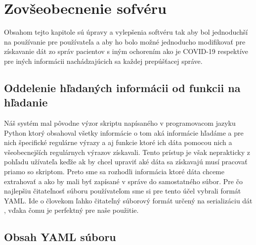 \chapter{Zovšeobecnenie sofvéru}

Obsahom tejto kapitole sú úpravy a vylepšenia softvéru tak aby bol jednoduchší na používanie pre používateľa a aby ho bolo možné jednoducho modifikovať pre získavanie dát zo správ pacientov s iným ochorením ako je COVID-19 respektíve pre iných informácii nachádzajúcich sa každej prepúšťacej správe.  

\section{Oddelenie hľadaných informácii od funkcii na hľadanie}

Náš systém mal pôvodne výzor skriptu napísaného v programovacom jazyku Python ktorý obsahoval všetky informácie o tom aká informácie hľadáme a pre nich špecifické regulárne výrazy a aj funkcie ktoré ich dáta pomocou nich a všeobecnejších regulárnych výrazov získavali. Tento prístup je však neprakticky z pohľadu užívateľa keďže ak by chcel upraviť aké dáta sa získavajú musí pracovať priamo so skriptom. Preto sme sa rozhodli informácia ktoré dáta chceme extrahovať a ako by mali byť zapísané v správe do samostatného súbor. Pre čo najlepšiu čitateľnosť súboru používateľom sme si pre tento účel vybrali formát YAML. Ide o človekom ľahko čitateľný súborový formát určený na serializáciu dát \cite{YAML}, vďaka čomu je perfektný pre naše použitie. 

\section{Obsah YAML súboru}
\label{obsahYAML}

